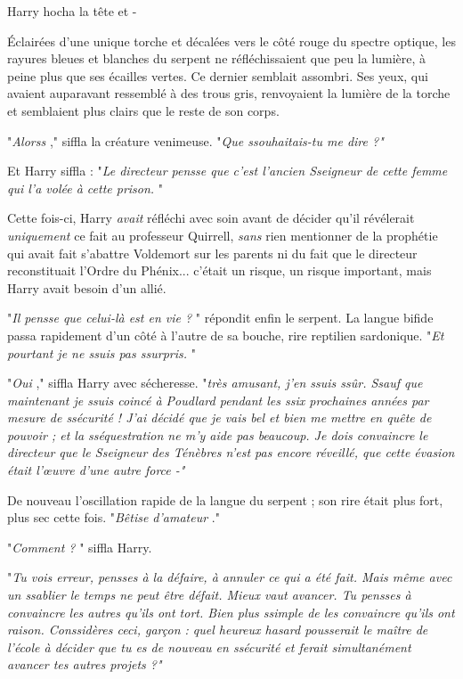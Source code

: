 Harry hocha la tête et -

Éclairées d'une unique torche et décalées vers le côté rouge du spectre optique, les rayures bleues et blanches du serpent ne réfléchissaient que peu la lumière, à peine plus que ses écailles vertes. Ce dernier semblait assombri. Ses yeux, qui avaient auparavant ressemblé à des trous gris, renvoyaient la lumière de la torche et semblaient plus clairs que le reste de son corps.

"\emph{Alorss} ," siffla la créature venimeuse. "\emph{Que ssouhaitais-tu me dire ?"} 

Et Harry siffla : "\emph{Le directeur pensse que c'est l'ancien Sseigneur de cette femme qui l'a volée à cette prison.} "

Cette fois-ci, Harry \emph{avait}  réfléchi avec soin avant de décider qu'il révélerait \emph{uniquement}  ce fait au professeur Quirrell, \emph{sans}  rien mentionner de la prophétie qui avait fait s'abattre Voldemort sur les parents ni du fait que le directeur reconstituait l'Ordre du Phénix... c'était un risque, un risque important, mais Harry avait besoin d'un allié.

"\emph{Il pensse que celui-là est en vie ?} " répondit enfin le serpent. La langue bifide passa rapidement d'un côté à l'autre de sa bouche, rire reptilien sardonique. "\emph{Et pourtant je ne ssuis pas ssurpris.} "

"\emph{Oui} ," siffla Harry avec sécheresse. "\emph{très amusant, j'en ssuis ssûr. Ssauf que maintenant je ssuis coincé à Poudlard pendant les ssix prochaines années par mesure de ssécurité ! J'ai décidé que je vais bel et bien me mettre en quête de pouvoir ; et la sséquestration ne m'y aide pas beaucoup. Je dois convaincre le directeur que le Sseigneur des Ténèbres n'est pas encore réveillé, que cette évasion était l'œuvre d'une autre force -"} 

De nouveau l'oscillation rapide de la langue du serpent ; son rire était plus fort, plus sec cette fois. "\emph{Bêtise d'amateur} ."

"\emph{Comment ?} " siffla Harry.

"\emph{Tu vois erreur, pensses à la défaire, à annuler ce qui a été fait. Mais même avec un ssablier le temps ne peut être défait. Mieux vaut avancer. Tu pensses à convaincre les autres qu'ils ont tort. Bien plus ssimple de les convaincre qu'ils ont raison. Conssidères ceci, garçon : quel heureux hasard pousserait le maître de l'école à décider que tu es de nouveau en ssécurité et ferait simultanément avancer tes autres projets ?"} 

